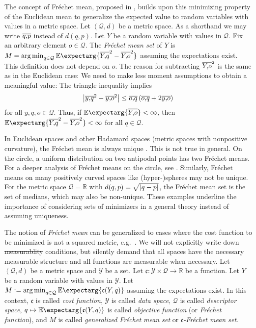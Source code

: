 \documentclass{scrartcl}
\newcommand{\Ex}{\E\expectarg}
\newcommand*{\mc}[1]{\mathcal{#1}}
\newcommand*{\mf}[1]{\mathfrak{#1}}
\newcommand{\R}{\mathbb{R}}
\DeclareMathOperator*{\argmin}{arg\,min}
\theoremstyle{plain}\newtheorem{theorem}{Theorem}[section]
\theoremstyle{definition}
\theoremstyle{remark}
\providecommand{\DIFaddtex}[1]{{\protect\color{blue}\uwave{#1}}} %
\providecommand{\DIFdeltex}[1]{{\protect\color{red}\sout{#1}}}                      %
\providecommand{\DIFaddbegin}{} %
\providecommand{\DIFaddend}{} %
\providecommand{\DIFdelbegin}{} %
\providecommand{\DIFdelend}{} %
\providecommand{\DIFadd}[1]{\texorpdfstring{\DIFaddtex{#1}}{#1}} %
\providecommand{\DIFdel}[1]{\texorpdfstring{\DIFdeltex{#1}}{}} %
\newcommand{\DIFscaledelfig}{0.5}
\newlength{\DIFdelgraphicswidth} %
\newlength{\DIFdelgraphicsheight} %
\newcommand{\DIFaddincludegraphics}[2][]{{\color{blue}\fbox{\DIFOincludegraphics[#1]{#2}}}} %
\newcommand{\DIFdelincludegraphics}[2][]{%
\sbox{\DIFdelgraphicsbox}{\DIFOincludegraphics[#1]{#2}}%
\settoboxwidth{\DIFdelgraphicswidth}{\DIFdelgraphicsbox} %
\settoboxtotalheight{\DIFdelgraphicsheight}{\DIFdelgraphicsbox} %
\scalebox{\DIFscaledelfig}{%
\parbox[b]{\DIFdelgraphicswidth}{\usebox{\DIFdelgraphicsbox}\\[-\baselineskip] \rule{\DIFdelgraphicswidth}{0em}}\llap{\resizebox{\DIFdelgraphicswidth}{\DIFdelgraphicsheight}{%
\setlength{\unitlength}{\DIFdelgraphicswidth}%
\begin{picture}(1,1)%
\thicklines\linethickness{2pt} %
{\color[rgb]{1,0,0}\put(0,0){\framebox(1,1){}}}%
{\color[rgb]{1,0,0}\put(0,0){\line( 1,1){1}}}%
{\color[rgb]{1,0,0}\put(0,1){\line(1,-1){1}}}%
\end{picture}%
}\hspace*{3pt}}} %
} %
\DeclareRobustCommand{\DIFaddbegin}{\DIFOaddbegin \let\includegraphics\DIFaddincludegraphics} %
\DeclareRobustCommand{\DIFaddend}{\DIFOaddend \let\includegraphics\DIFOincludegraphics} %
\DeclareRobustCommand{\DIFdelbegin}{\DIFOdelbegin \let\includegraphics\DIFdelincludegraphics} %
\DeclareRobustCommand{\DIFdelend}{\DIFOaddend \let\includegraphics\DIFOincludegraphics} %
\begin{document}
The concept of Fréchet mean, proposed in \cite{frechet48}, builds upon this minimizing property of the Euclidean mean to generalize the expected value to random variables with values in a metric space. Let $(\mc Q, d)$ be a metric space. As a shorthand we may write $\overline{q,\!p}$ instead of $d(q,p)$. Let $Y$ be a random variable with values in $\mc Q$. Fix an arbitrary element $o\in \mc Q$. The \emph{Fréchet mean set} of $Y$ is $M = \argmin_{q\in\mc Q} \Ex{\ol Yq^2- \ol Yo^2}$ assuming the expectations exist. 
This definition does not depend on $o$. The reason for subtracting $\overline{Y,\!o}^2$ is the same as in the Euclidean case: We need to make less moment assumptions to obtain a meaningful value: The triangle inequality implies
\begin{equation*}
\left| \overline{y,\!q}^2 - \overline{y,\!o}^2 \right| \leq \overline{o,\!q} \left( \overline{o,\!q} + 2 \overline{y,\!o} \right)
\end{equation*}
for all $y,q,o\in\mc Q$. Thus, if $\Ex{\ol Yo} < \infty$, then $\Ex{\ol Yq^2 - \ol Yo^2} < \infty$ for all $q\in\mc Q$.

In Euclidean spaces and other Hadamard spaces (metric spaces with nonpositive curvature), the Fréchet mean is always unique \cite[Proposition 4.3]{sturm03}. This is not true in general. On the circle, a uniform distribution on two antipodal points has two Fréchet means. For a deeper analysis of Fréchet means on the circle, see \cite{hotz15}. Similarly, Fréchet means on many positively curved spaces like (hyper-)spheres may not be unique. For the metric space $\mc Q = \R$ with $d(q,p) =\sqrt{\left| q-p \right|}$, the Fréchet mean set is the set of medians, which may also be non-unique. These examples underline the importance of considering sets of minimizers in a general theory instead of assuming uniqueness.

The notion of \textit{Fréchet mean} can be generalized to cases where the cost function to be minimized is not a squared metric, e.g.\ \cite{huckemann11}. We will not explicitly write down \DIFdelbegin \DIFdel{measurablity }\DIFdelend \DIFaddbegin \DIFadd{measurability }\DIFaddend conditions, but silently demand that all spaces have the necessary measurable structure and all functions are measurable when necessary. Let $(\mc Q, d)$ be a metric space and $\mc Y$ be a set. Let $\mf c \colon \mc Y \times \mc Q \to \R$ be a function. Let $Y$ be a random variable with values in $\mc Y$. Let $M := \argmin_{q\in\mc Q} \Ex{\mf c(Y, q)}$ assuming the expectations exist. 
In this context, $\mf c$ is called \textit{cost function}, $\mc Y$ is called \textit{data space}, $\mc Q$ is called \textit{descriptor space}, $q\mapsto\Ex{\mf c(Y, q)}$ is called \textit{objective function} (or \textit{Fréchet function}), and $M$ is called \textit{generalized Fréchet mean set} or \textit{$\mf c$-Fréchet mean set}. 
\end{document}
